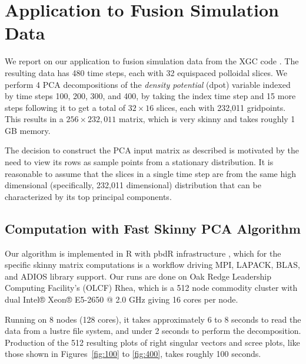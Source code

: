 \newpage
\section{Application to Fusion Simulation Data}
\label{sec:xgc}
We report on our application to fusion simulation data from the XGC
code \cite{??}. The resulting data has 480 time steps, each with 32
equispaced polloidal slices. We perform 4 PCA decompositions of the
{\it density potential} (dpot) variable indexed by time steps 100,
200, 300, and 400, by taking the index time step and 15 more steps
following it to get a total of $32\times 16$ slices, each with 232,011
gridpoints. This results in a $256\times 232,011$ matrix, which is
very skinny and takes roughly 1 GB memory.

The decision to construct the PCA input matrix as described is
motivated by the need to view its rows as sample points from a
stationary distribution. It is reasonable to assume that the slices in
a single time step are from the same high dimensional (specifically,
232,011 dimensional) distribution that can be characterized by its top
principal components.

\subsection{Computation with Fast Skinny PCA Algorithm}
Our algorithm is implemented in R with pbdR infrastructure
\cite{Schmidt2017}, which for the specific skinny matrix computations
is a workflow driving MPI, LAPACK, BLAS, and ADIOS library
support. Our runs are done on Oak Redge Leadership Computing
Facility's (OLCF) Rhea, which is a 512 node commodity cluster with
dual Intel® Xeon® E5-2650 @ 2.0 GHz giving 16 cores per node.

Running on 8 nodes (128 cores), it takes
approximately 6 to 8 seconds to read the data from a lustre file
system, and under 2 seconds to perform the decomposition. Production
of the 512 resulting plots of right singular vectors and scree plots, like
those shown in Figures~\ref{fig:100} to \ref{fig:400}, takes roughly
100 seconds.

